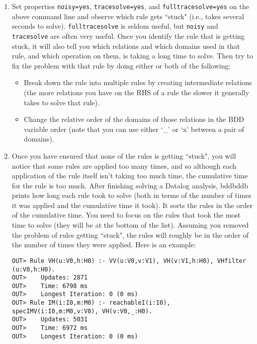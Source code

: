 \begin{enumerate}

\item

Set properties \verb+noisy=yes+, \verb+tracesolve=yes+, and \verb+fulltracesolve=yes+
on the above command line and observe which rule gets ``stuck" (i.e., takes several seconds to solve).
\verb+fulltracesolve+ is seldom useful, but \verb+noisy+ and \verb+tracesolve+ are
often very useful.  Once you identify the rule that is getting stuck, it
will also tell you which relations and which domains used in that rule,
and which operation on them, is taking a long time to solve.  Then try
to fix the problem with that rule by doing either or both of the following:
\begin{itemize}
\item
Break down the rule into multiple rules by creating intermediate relations (the more
relations you have on the RHS of a rule the slower it generally takes to solve
that rule).
\item
Change the relative order of the domains of those
relations in the BDD variable order
(note that you can use either `\_' or `x' between a pair of domains).
\end{itemize}

\item

Once you have ensured that none of the rules is getting ``stuck",
you will notice that some rules are applied too many times, and so
although each application of the rule itself isn't taking too much
time, the cumulative time for the rule is too much.  After finishing
solving a Datalog analysis, bddbddb prints how long each rule took to
solve (both in terms of the number of times it was applied and the
cumulative time it took).  It sorts the rules in the order of the
cumulative time.  You need to focus on the rules that took the most
time to solve (they will be at the bottom of the list).  Assuming you
removed the problem of rules getting ``stuck", the rules will roughly
be in the order of the number of times they were applied.  Here is an
example:

\begin{framed}
\begin{verbatim}
OUT> Rule VH(u:V0,h:H0) :- VV(u:V0,v:V1), VH(v:V1,h:H0), VHfilter
(u:V0,h:H0).
OUT>    Updates: 2871
OUT>    Time: 6798 ms
OUT>    Longest Iteration: 0 (0 ms)
OUT> Rule IM(i:I0,m:M0) :- reachableI(i:I0), specIMV(i:I0,m:M0,v:V0), VH(v:V0,_:H0).
OUT>    Updates: 5031
OUT>    Time: 6972 ms
OUT>    Longest Iteration: 0 (0 ms)
\end{verbatim}
\end{framed}


\end{enumerate}
